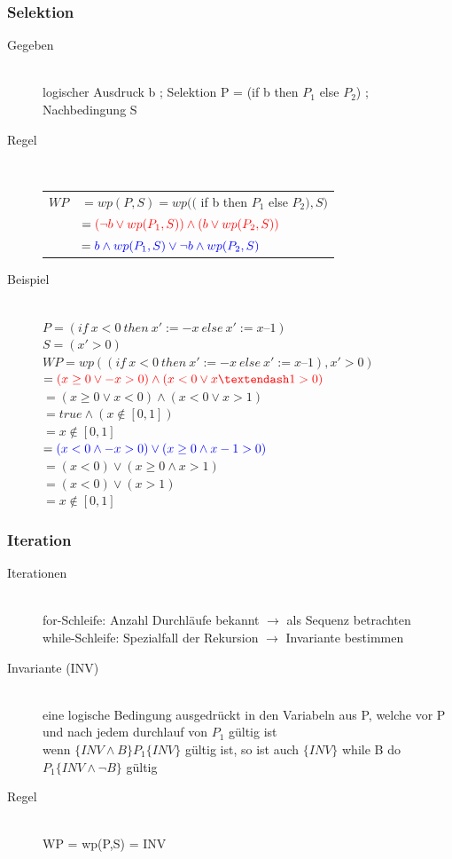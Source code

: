 \documentclass[a4paper,10pt]{article}
\newcommand{\ra}{\rightarrow}
\begin{document}
\subsubsection{Selektion}
\begin{description}
	\item[Gegeben] \hfill \\
		logischer Ausdruck b ;
		Selektion P = (if b then $P_1$ else $P_2$) ;
		Nachbedingung S
	\item[Regel] \hfill \\
		\begin{tabular}{ll}
		$WP $&$= wp(P, S) = wp(($ if b then $P_1$ else $P_2), S)$ \\
		&$=\textcolor{red}{(\neg b \vee wp(P_1,S)) \wedge (b \vee wp(P_2,S))}$ \\
		&$=\textcolor{blue}{b \wedge wp(P_1,S)\vee \neg b \wedge wp(P_2,S)}$
		\end{tabular}
	\item[Beispiel] \hfill \\
		$P = (if~x < 0~then~x' := -x~else~x' := x – 1)$ \\
		$S = (x' > 0)$ \\
		$WP = wp((if~x < 0~then~x' := -x~else~x' := x – 1), x' > 0)$ \\
		$=\textcolor{red}{(x \geq 0 \vee -x > 0) \wedge (x < 0 \vee x – 1 > 0)}$ \\
		$= (x ≥ 0 \vee x < 0) \wedge (x < 0 \vee x > 1)$ \\
		$= true \wedge (x \notin [0, 1])$ \\
		$= x \notin [0, 1]$ \\
		$=\textcolor{blue}{(x < 0 \wedge -x > 0) \vee (x \ge 0 \wedge x - 1 > 0)}$ \\
		$= (x < 0) \vee (x \ge 0 \wedge x > 1)$ \\
		$= (x < 0) \vee (x > 1)$ \\
		$= x \notin [0, 1]$
\end{description}

\subsubsection{Iteration}
\begin{description}
	\item[Iterationen] \hfill \\
		for-Schleife: Anzahl Durchl\"aufe bekannt $\ra$ als Sequenz betrachten \\
		while-Schleife: Spezialfall der Rekursion $\ra$ Invariante bestimmen
	\item[Invariante (INV)] \hfill \\
		eine logische Bedingung ausgedr\"uckt in den Variabeln aus P, welche vor P und nach jedem durchlauf von $P_1$ g\"ultig ist \\
		wenn $\{INV \wedge B\} P_1 \{ INV \}$ g\"ultig ist, so ist auch  $\{INV \}$ while B do $P_1 \{ INV \wedge \neg B \}$ g\"ultig
	\item[Regel] \hfill \\
		WP = wp(P,S) = INV
\end{description}
\end{document}
